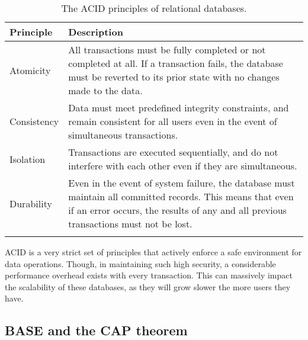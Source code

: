 
\begin{longtable}{ | p{} | p{} | }
    \hline
    \cellcolor{blue!25}Principle & \cellcolor{blue!25}Description\\
    \hline
    Atomicity & All transactions must be fully completed or not completed at all. If a transaction fails,
    the database must be reverted to its prior state with no changes made to the data.  \\
    \hline
    Consistency & Data must meet predefined integrity constraints, and remain consistent for all users even in the event 
    of simultaneous transactions.  \\
    \hline 
    Isolation & Transactions are executed sequentially, and do not interfere with each other even if they are simultaneous. \\
    \hline 
    Durability & Even in the event of system failure, the database must maintain all committed records. This means that 
    even if an error occurs, the results of any and all previous transactions must not be lost. \\
    \hline
    \caption{The ACID principles of relational databases. \autocite{awsACIDVsBASE,neo4jDataConsistencyModels2023}}\label{tab:ACID}
\end{longtable}

\noindent ACID is a very strict set of principles that actively enforce a safe environment for data operations. Though, in maintaining 
such high security, a considerable performance overhead exists with every transaction. This can massively impact the scalability of these 
databases, as they will grow slower the more users they have. 

\subsection{BASE and the CAP theorem}

